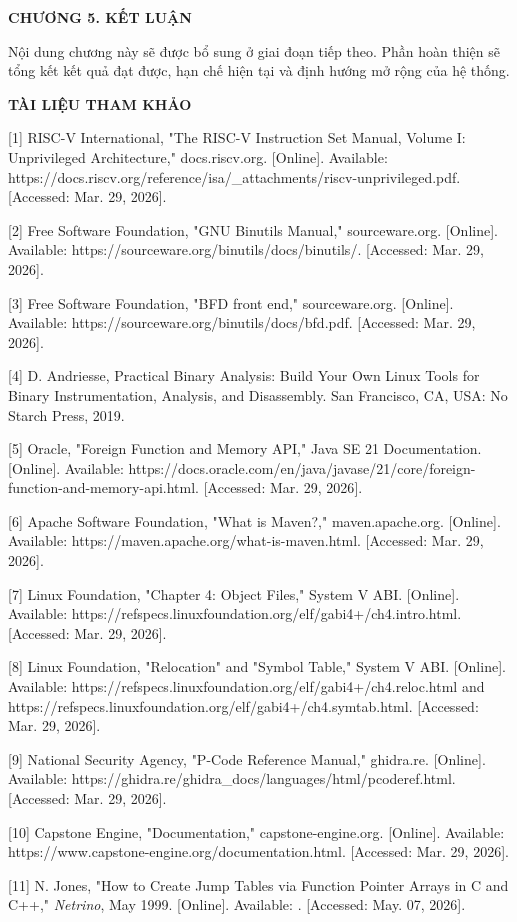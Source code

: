 \documentclass[
]{article}
\begin{document}
\textbf{CHƯƠNG 5. KẾT LUẬN}

Nội dung chương này sẽ được bổ sung ở giai đoạn tiếp theo. Phần hoàn
thiện sẽ tổng kết kết quả đạt được, hạn chế hiện tại và định hướng mở
rộng của hệ thống.

\textbf{TÀI LIỆU THAM KHẢO}

{[}1{]} RISC-V International, "The RISC-V Instruction Set Manual, Volume
I: Unprivileged Architecture," docs.riscv.org. {[}Online{]}. Available:
https://docs.riscv.org/reference/isa/\_attachments/riscv-unprivileged.pdf.
{[}Accessed: Mar. 29, 2026{]}.

{[}2{]} Free Software Foundation, "GNU Binutils Manual," sourceware.org.
{[}Online{]}. Available: https://sourceware.org/binutils/docs/binutils/.
{[}Accessed: Mar. 29, 2026{]}.

{[}3{]} Free Software Foundation, "BFD front end," sourceware.org.
{[}Online{]}. Available: https://sourceware.org/binutils/docs/bfd.pdf.
{[}Accessed: Mar. 29, 2026{]}.

{[}4{]} D. Andriesse, Practical Binary Analysis: Build Your Own Linux
Tools for Binary Instrumentation, Analysis, and Disassembly. San
Francisco, CA, USA: No Starch Press, 2019.

{[}5{]} Oracle, "Foreign Function and Memory API," Java SE 21
Documentation. {[}Online{]}. Available:
https://docs.oracle.com/en/java/javase/21/core/foreign-function-and-memory-api.html.
{[}Accessed: Mar. 29, 2026{]}.

{[}6{]} Apache Software Foundation, "What is Maven?," maven.apache.org.
{[}Online{]}. Available: https://maven.apache.org/what-is-maven.html.
{[}Accessed: Mar. 29, 2026{]}.

{[}7{]} Linux Foundation, "Chapter 4: Object Files," System V ABI.
{[}Online{]}. Available:
https://refspecs.linuxfoundation.org/elf/gabi4+/ch4.intro.html.
{[}Accessed: Mar. 29, 2026{]}.

{[}8{]} Linux Foundation, "Relocation" and "Symbol Table," System V ABI.
{[}Online{]}. Available:
https://refspecs.linuxfoundation.org/elf/gabi4+/ch4.reloc.html and
https://refspecs.linuxfoundation.org/elf/gabi4+/ch4.symtab.html.
{[}Accessed: Mar. 29, 2026{]}.

{[}9{]} National Security Agency, "P-Code Reference Manual," ghidra.re.
{[}Online{]}. Available:
https://ghidra.re/ghidra\_docs/languages/html/pcoderef.html.
{[}Accessed: Mar. 29, 2026{]}.

{[}10{]} Capstone Engine, "Documentation," capstone-engine.org.
{[}Online{]}. Available:
https://www.capstone-engine.org/documentation.html. {[}Accessed: Mar.
29, 2026{]}.

{[}11{]} N. Jones, "How to Create Jump Tables via Function Pointer
Arrays in C and C++," \emph{Netrino}, May 1999. {[}Online{]}. Available:
. {[}Accessed: May. 07, 2026{]}.
\end{document}

